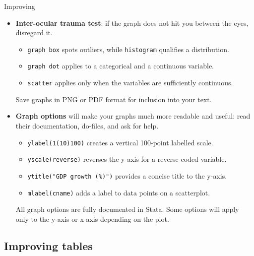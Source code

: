 \documentclass[t]{beamer}
\begin{document}
	\begin{frame}[t]{Improving }

		\begin{itemize}
			
			\item \textbf{Inter-ocular trauma test}: if the graph does not hit you between the eyes, disregard it.

			\begin{itemize}
				\item \texttt{graph box} spots outliers, while \texttt{histogram} qualifies a distribution.
				
				\item \texttt{graph dot} applies to a categorical and a continuous variable.
				\item \texttt{scatter} applies only when the variables are sufficiently continuous.
			\end{itemize}
			
			Save graphs in PNG or PDF format for inclusion into your text.
			
			\item \textbf{Graph options} will make your graphs much more readable and useful: read their documentation, do-files, and ask for help.
			
			\begin{itemize}
				\item \texttt{ylabel(1(10)100)} creates a vertical 100-point labelled scale.
				\item \texttt{yscale(reverse)} reverses the y-axis for a reverse-coded variable.
				\item \texttt{ytitle("GDP growth (\%)")} provides a concise title to the y-axis.
				\item \texttt{mlabel(cname)} adds a label to data points on a scatterplot.
			\end{itemize}
			All graph options are fully documented in Stata. Some options will apply only to the y-axis or x-axis depending on the plot.
		
		\end{itemize}

	\end{frame}

	\subsection{Improving tables}
			
\end{document}
